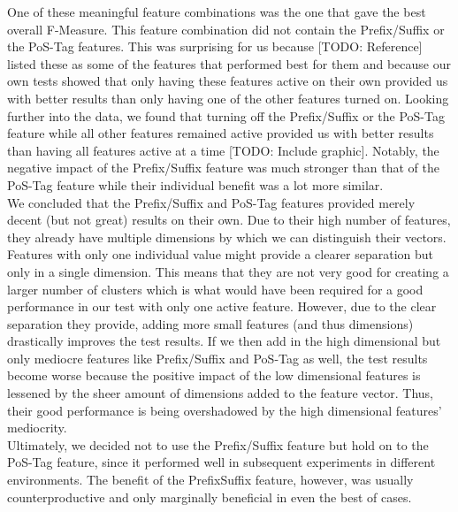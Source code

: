 One of these meaningful feature combinations was the one that gave the best overall F-Measure.
This feature combination did not contain the Prefix/Suffix or the PoS-Tag features.
This was surprising for us because [TODO: Reference] listed these as some of the features that performed best for them and because our own tests showed that only having these features active on their own provided us with better results than only having one of the other features turned on.
Looking further into the data, we found that turning off the Prefix/Suffix or the PoS-Tag feature while all other features remained active provided us with better results than having all features active at a time [TODO: Include graphic].
Notably, the negative impact of the Prefix/Suffix feature was much stronger than that of the PoS-Tag feature while their individual benefit was a lot more similar.
\\
We concluded that the Prefix/Suffix and PoS-Tag features provided merely decent (but not great) results on their own.
Due to their high number of features, they already have multiple dimensions by which we can distinguish their vectors.
Features with only one individual value might provide a clearer separation but only in a single dimension.
This means that they are not very good for creating a larger number of clusters which is what would have been required for a good performance in our test with only one active feature.
However, due to the clear separation they provide, adding more small features (and thus dimensions) drastically improves the test results.
If we then add in the high dimensional but only mediocre features like Prefix/Suffix and PoS-Tag as well, the test results become worse because the positive impact of the low dimensional features is lessened by the sheer amount of dimensions added to the feature vector.
Thus, their good performance is being overshadowed by the high dimensional features' mediocrity.
\\
Ultimately, we decided not to use the Prefix/Suffix feature but hold on to the PoS-Tag feature, since it performed well in subsequent experiments in different environments.
The benefit of the PrefixSuffix feature, however, was usually counterproductive and only marginally beneficial in even the best of cases.

